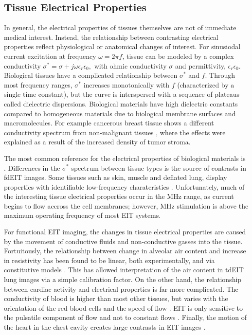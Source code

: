 \documentclass[12pt]{article} \usepackage[margin=3cm]{geometry} \usepackage[margin=20pt,font=small,labelfont=bf]{caption}\def\TBLWIDA{35mm}\def\TBLWIDB{95mm}
\begin{document}
\subsection{Tissue Electrical Properties}

In general, the electrical properties of tissues themselves are not 
of immediate medical interest. Instead, the relationship between
contrasting electrical properties reflect physiological or anatomical
changes of interest. For sinusiodal current excitation at 
frequency $\omega=2\pi f$, tissue can be modeled by a
complex conductivity
$
\sigma^* = \sigma + j\omega\epsilon_r\epsilon_0,
$
with ohmic conductivity $\sigma$ and 
permittivity, $\epsilon_r\epsilon_0$.
Biological tissues have a complicated relationship between
$\sigma^*$ and $f$. Through most frequency ranges, $\sigma^*$
increases monotonically with $f$ (characterized
by a single time constant), but the curve is
 interspersed with a sequence of plateaus
called dielectric dispersions. Biological materials
have high dielectric constants compared to homogeneous
materials due to biological membrane surfaces and macromolecules.
For example cancerous breast tissue
shows a different conductivity spectrum
from non-malignant tissues \cite{Jossinet1998Breast},
where the effects were explained
as a result of the increased density of tumor stroma.

The most common reference for the electrical 
properties of biological materials is \cite{Gabriel1996Dielectric}.
Differences in the $\sigma^*$ spectrum between
tissue types is the source of contrasts in fdEIT images.
Some tissues
such as skin, muscle and deflated lung, display properties
with identifiable low-frequency charateristics 
\cite{Gabriel2009Frequencies}. Unfortunately, much of 
the interesting tissue electrical properties
occur in the MHz range, as current begins to flow accross the
cell membranes; however, MHz stimulation is above the maximum operating frequency
of most EIT systems.

For functional EIT imaging, the changes in tissue
electrical properties are caused by the movement of
conductive fluids and non-conductive gasses into
the tissue. Fortuitously, the relationship between
change in alveolar air content and increase in 
resistivity has been found to be linear, both
experimentally,
 and via constitutive models \cite{Roth2015Correlation}.
This has allowed interpretation of the air 
content in  tdEIT lung images via a simple calibration factor.
On the other hand, the relationship between 
cardiac activity and electrical properties is far
more complicated. The conductivity of blood is 
higher than most other tissues, but varies with
the orientation of the red blood cells and the
speed of flow \cite{Hoetink2004Flow}.
EIT is only sensitive to the
pulsatile component of flow 
and not to constant flows \cite{Frerichs2017Chest}.
Finally, the motion of the heart in the chest cavity
creates large contrasts in EIT images \cite{Proenca2015Motion}.
\end{document}
